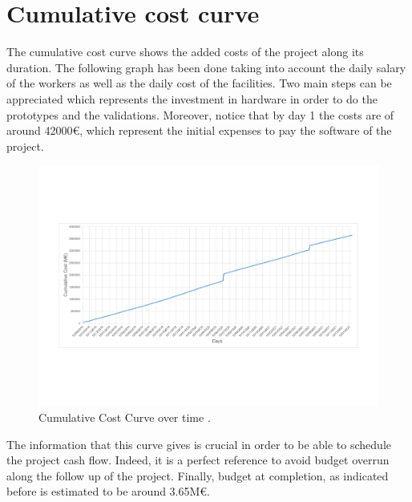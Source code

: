 \section{Cumulative cost curve}

The cumulative cost curve shows the added costs of the project along its duration. The following graph has been done taking into account the daily salary of the workers as well as the daily cost of the facilities. Two main steps can be appreciated which represents the investment in hardware in order to do the prototypes and the validations. Moreover, notice that by day 1 the costs are of around 42000\euro, which represent the initial expenses to pay the software of the project.

\begin{figure}[H]
	\centering
	\includegraphics[width=0.65\linewidth]{./images/CumulativeCost}
	\caption[Cumulative Cost Curve over time]{Cumulative Cost Curve over time \cite{workfront2017}.}
	\label{fig:CumulativeCost}
\end{figure} 

The information that this curve gives is crucial in order to be able to schedule the project cash flow. Indeed, it is a perfect reference to avoid budget overrun along the follow up of the project. Finally, budget at completion, as indicated before is estimated to be around 3.65M\euro.